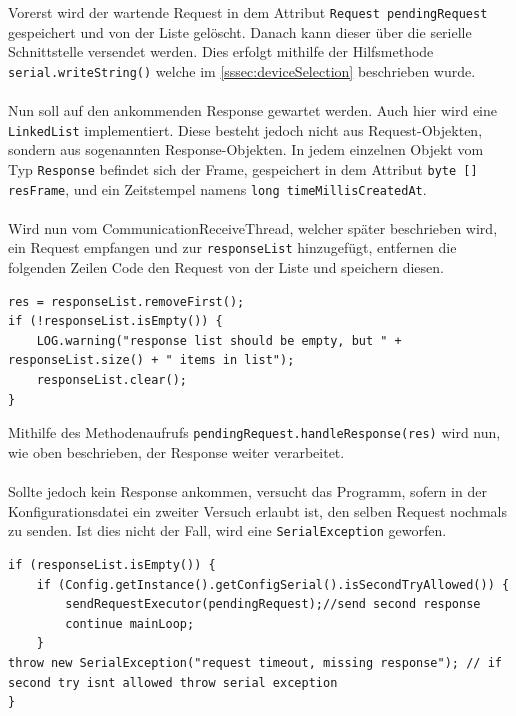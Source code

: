 Vorerst wird der wartende Request in dem Attribut \lstinline[style=java]{Request pendingRequest} gespeichert und von der Liste gelöscht.
Danach kann dieser über die serielle Schnittstelle versendet werden.
Dies erfolgt mithilfe der Hilfsmethode \lstinline[style=java]{serial.writeString()} welche im \autoref{sssec:deviceSelection} beschrieben wurde.\\\\
Nun soll auf den ankommenden Response gewartet werden.
Auch hier wird eine \lstinline[style=java]{LinkedList} implementiert.
Diese besteht jedoch nicht aus Request-Objekten, sondern aus sogenannten Response-Objekten.
In jedem einzelnen Objekt vom Typ \lstinline[style=java]{Response} befindet sich der Frame, gespeichert in dem Attribut \lstinline[style=java]{byte [] resFrame}, und ein Zeitstempel namens \lstinline[style=java]{long timeMillisCreatedAt}.\\\\
Wird nun vom CommunicationReceiveThread, welcher später beschrieben wird, ein Request empfangen und zur \lstinline[style=java]{responseList} hinzugefügt, entfernen die folgenden Zeilen Code den Request von der Liste und speichern diesen.
\begin{lstlisting}[style=java,caption=Teilabschnitt CommunicationSendThread,label=commThreadSend]
res = responseList.removeFirst();
if (!responseList.isEmpty()) {
    LOG.warning("response list should be empty, but " + responseList.size() + " items in list");
    responseList.clear();
}
\end{lstlisting}
Mithilfe des Methodenaufrufs \lstinline[style=java]{pendingRequest.handleResponse(res)} wird nun, wie oben beschrieben, der Response weiter verarbeitet.\\\\
Sollte jedoch kein Response ankommen, versucht das Programm, sofern in der Konfigurationsdatei ein zweiter Versuch erlaubt ist, den selben Request nochmals zu senden.
Ist dies nicht der Fall, wird eine \lstinline[style=java]{SerialException} geworfen.
\begin{lstlisting}[style=java,caption=Teilabschnitt CommunicationSendThread,label=commThreadSend]
if (responseList.isEmpty()) {
    if (Config.getInstance().getConfigSerial().isSecondTryAllowed()) {
        sendRequestExecutor(pendingRequest);//send second response
        continue mainLoop;
    }
throw new SerialException("request timeout, missing response"); // if second try isnt allowed throw serial exception
}
\end{lstlisting}
